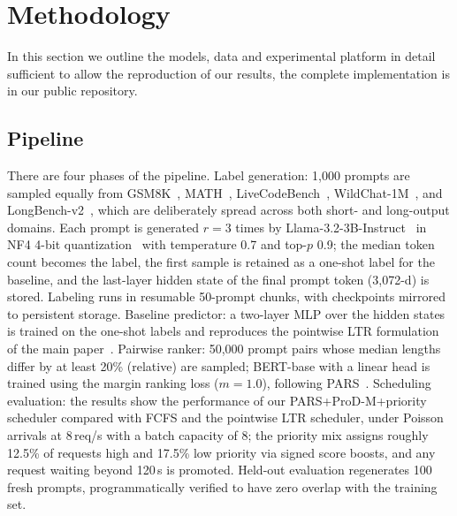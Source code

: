 \documentclass[conference]{IEEEtran}
\begin{document}
\clearpage
\section{Methodology}
In this section we outline the models, data and experimental platform in detail sufficient to allow the reproduction of our results, the complete implementation is in our public repository.

\subsection{Pipeline}
There are four phases of the pipeline. Label generation: 1,000 prompts are sampled equally from GSM8K~\cite{cobbe2021gsm8k}, MATH~\cite{hendrycks2021math}, LiveCodeBench~\cite{jain2025livecodebench}, WildChat-1M~\cite{zhao2024wildchat}, and LongBench-v2~\cite{bai2025longbench}, which are deliberately spread across both short- and long-output domains. Each prompt is generated $r=3$ times by Llama-3.2-3B-Instruct~\cite{dubey2024llama3} in NF4 4-bit quantization~\cite{dettmers2023qlora} with temperature 0.7 and top-$p$ 0.9; the median token count becomes the label, the first sample is retained as a one-shot label for the baseline, and the last-layer hidden state of the final prompt token (3,072-d) is stored. Labeling runs in resumable 50-prompt chunks, with checkpoints mirrored to persistent storage. Baseline predictor: a two-layer MLP over the hidden states is trained on the one-shot labels and reproduces the pointwise LTR formulation of the main paper~\cite{fu2024efficient}. Pairwise ranker: 50,000 prompt pairs whose median lengths differ by at least 20\% (relative) are sampled; BERT-base with a linear head is trained using the margin ranking loss ($m=1.0$), following PARS~\cite{tao2025pars}. Scheduling evaluation: the results show the performance of our PARS+ProD-M+priority scheduler compared with FCFS and the pointwise LTR scheduler, under Poisson arrivals at 8\,req/s with a batch capacity of 8; the priority mix assigns roughly 12.5\% of requests high and 17.5\% low priority via signed score boosts, and any request waiting beyond 120\,s is promoted. Held-out evaluation regenerates 100 fresh prompts, programmatically verified to have zero overlap with the training set.
\end{document}
